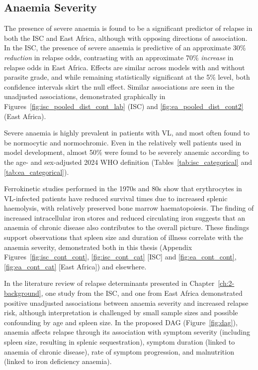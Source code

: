 \subsection{Anaemia Severity}

The presence of severe anaemia is found to be a significant predictor of relapse in both the ISC and East Africa, although with opposing directions of association. In the ISC, the presence of severe anaemia is predictive of an approximate 30\% \textit{reduction} in relapse odds, contrasting with an approximate 70\% \textit{increase} in relapse odds in East Africa. Effects are similar across models with and without parasite grade, and while remaining statistically significant at the 5\% level, both confidence intervals skirt the null effect. Similar associations are seen in the unadjusted associations, demonstrated graphically in Figures~\ref{fig:isc_pooled_dist_cont_lab} (ISC) and \ref{fig:ea_pooled_dist_cont2} (East Africa).

Severe anaemia is highly prevalent in patients with VL, and most often found to be normocytic and normochromic\cite{varma2010, goto2017}. Even in the relatively well patients used in model development, almost 50\% were found to be severely anaemic according to the age- and sex-adjusted 2024 WHO definition\cite{who_haem2024} (Tables~\ref{tab:isc_categorical} and \ref{tab:ea_categorical}).

Ferrokinetic studies performed in the 1970s and 80s show that erythrocytes in VL-infected patients have reduced survival times due to increased splenic haemolysis, with relatively preserved bone marrow haematopoiesis\cite{woodruff1972, volti1980}. The finding of increased intracellular iron stores and reduced circulating iron suggests that an anaemia of chronic disease also contributes to the overall picture\cite{pippard1986}. These findings support observations that spleen size and duration of illness correlate with the anaemia severity, demonstrated both in this thesis (Appendix Figures~\ref{fig:isc_cont_cont}, \ref{fig:isc_cont_cat} [ISC] and \ref{fig:ea_cont_cont}, \ref{fig:ea_cont_cat} [East Africa]) and elsewhere\cite{varma2010, marwaha1991,goto2017}.

In the literature review of relapse determinants presented in Chapter~\ref{ch:2-background}, one study from the ISC\cite{lucero2015}, and one from East Africa\cite{kennedy2024} demonstrated positive unadjusted associations between anaemia severity and increased relapse risk, although interpretation is challenged by small sample sizes and possible confounding by age and spleen size. In the proposed DAG (Figure~\ref{fig:dag}), anaemia affects relapse through its association with symptom severity (including spleen size, resulting in splenic sequestration), symptom duration (linked to anaemia of chronic disease), rate of symptom progression, and malnutrition (linked to iron deficiency anaemia).

